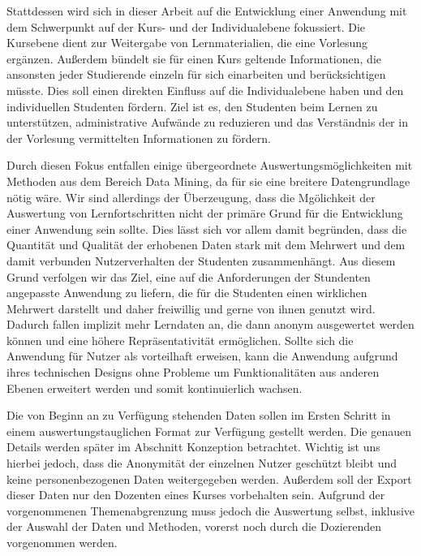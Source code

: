 Stattdessen wird sich in dieser Arbeit auf die Entwicklung einer Anwendung mit dem Schwerpunkt auf der Kurs- und der Individualebene fokussiert.
Die Kursebene dient zur Weitergabe von Lernmaterialien, die eine Vorlesung ergänzen. Außerdem bündelt sie für einen Kurs geltende Informationen, die ansonsten jeder Studierende einzeln für sich einarbeiten und berücksichtigen müsste. Dies soll einen direkten Einfluss auf die Individualebene haben und den individuellen Studenten fördern. Ziel ist es, den Studenten beim Lernen zu unterstützen, administrative Aufwände zu reduzieren und das Verständnis der in der Vorlesung vermittelten Informationen zu fördern.  

Durch diesen Fokus entfallen einige übergeordnete Auswertungsmöglichkeiten mit Methoden aus dem Bereich Data Mining, da für sie eine breitere Datengrundlage nötig wäre. Wir sind allerdings der Überzeugung, dass die Mgölichkeit der Auswertung von Lernfortschritten nicht der primäre Grund für die Entwicklung einer Anwendung sein sollte. Dies lässt sich vor allem damit begründen, dass die Quantität und Qualität der erhobenen Daten stark mit dem Mehrwert und dem damit verbunden Nutzerverhalten der Studenten zusammenhängt. Aus diesem Grund verfolgen wir das Ziel, eine auf die Anforderungen der Stundenten angepasste Anwendung zu liefern, die für die Studenten einen wirklichen Mehrwert darstellt und daher freiwillig und gerne von ihnen genutzt wird. Dadurch fallen implizit mehr Lerndaten an, die dann anonym ausgewertet werden können und eine höhere Repräsentativität ermöglichen. Sollte sich die Anwendung für Nutzer als vorteilhaft erweisen, kann die Anwendung aufgrund ihres technischen Designs ohne Probleme um Funktionalitäten aus anderen Ebenen erweitert werden und somit kontinuierlich wachsen.

Die von Beginn an zu Verfügung stehenden Daten sollen im Ersten Schritt in einem auswertungstauglichen Format zur Verfügung gestellt werden. Die genauen Details werden später im Abschnitt Konzeption betrachtet. Wichtig ist uns hierbei jedoch, dass die Anonymität der einzelnen Nutzer geschützt bleibt und keine personenbezogenen Daten weitergegeben werden. Außerdem soll der Export dieser Daten nur den Dozenten eines Kurses vorbehalten sein. Aufgrund der vorgenommenen Themenabgrenzung muss jedoch die Auswertung selbst, inklusive der Auswahl der Daten und Methoden, vorerst noch durch die Dozierenden vorgenommen werden. 

